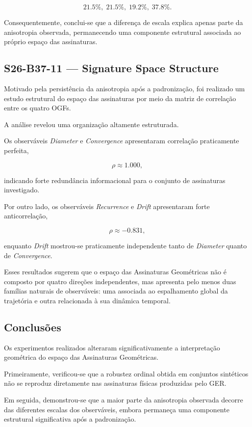 \documentclass[11pt,a4paper]{article}
\begin{document}
\[
21.5\%,\;
21.5\%,\;
19.2\%,\;
37.8\%.
\]

Consequentemente, conclui-se que a diferença de escala explica apenas parte
da anisotropia observada, permanecendo uma componente estrutural associada
ao próprio espaço das assinaturas.

\subsection{S26-B37-11 --- Signature Space Structure}

Motivado pela persistência da anisotropia após a padronização, foi
realizado um estudo estrutural do espaço das assinaturas por meio da matriz
de correlação entre os quatro OGFs.

A análise revelou uma organização altamente estruturada.

Os observáveis \emph{Diameter} e \emph{Convergence} apresentaram correlação
praticamente perfeita,

\[
\rho \approx 1.000,
\]

indicando forte redundância informacional para o conjunto de assinaturas
investigado.

Por outro lado, os observáveis \emph{Recurrence} e \emph{Drift}
apresentaram forte anticorrelação,

\[
\rho \approx -0.831,
\]

enquanto \emph{Drift} mostrou-se praticamente independente tanto de
\emph{Diameter} quanto de \emph{Convergence}.

Esses resultados sugerem que o espaço das Assinaturas Geométricas não é
composto por quatro direções independentes, mas apresenta pelo menos duas
famílias naturais de observáveis: uma associada ao espalhamento global da
trajetória e outra relacionada à sua dinâmica temporal.

\subsection{Conclusões}

Os experimentos realizados alteraram significativamente a interpretação
geométrica do espaço das Assinaturas Geométricas.

Primeiramente, verificou-se que a robustez ordinal obtida em conjuntos
sintéticos não se reproduz diretamente nas assinaturas físicas produzidas
pelo GER.

Em seguida, demonstrou-se que a maior parte da anisotropia observada decorre
das diferentes escalas dos observáveis, embora permaneça uma componente
estrutural significativa após a padronização.
\end{document}
